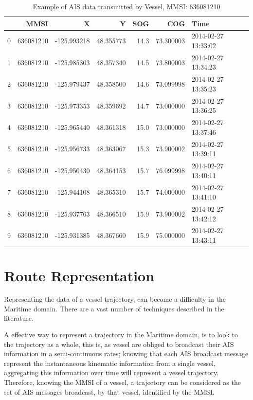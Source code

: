 \begin{table}[H]
  \centering
{\small
\begin{tabular}{lrrrrrl}
\toprule
{} &       MMSI &           X &          Y &   SOG &        COG &                Time \\
\midrule
0 &  636081210 & -125.993218 &  48.355773 &  14.3 &  73.300003 & 2014-02-27 13:33:02 \\
1 &  636081210 & -125.985303 &  48.357340 &  14.5 &  73.800003 & 2014-02-27 13:34:23 \\
2 &  636081210 & -125.979437 &  48.358500 &  14.6 &  73.099998 & 2014-02-27 13:35:23 \\
3 &  636081210 & -125.973353 &  48.359692 &  14.7 &  73.000000 & 2014-02-27 13:36:25 \\
4 &  636081210 & -125.965440 &  48.361318 &  15.0 &  73.000000 & 2014-02-27 13:37:46 \\
5 &  636081210 & -125.956733 &  48.363067 &  15.3 &  73.900002 & 2014-02-27 13:39:11 \\
6 &  636081210 & -125.950430 &  48.364153 &  15.7 &  76.099998 & 2014-02-27 13:40:11 \\
7 &  636081210 & -125.944108 &  48.365310 &  15.7 &  74.000000 & 2014-02-27 13:41:10 \\
8 &  636081210 & -125.937763 &  48.366510 &  15.9 &  73.900002 & 2014-02-27 13:42:12 \\
9 &  636081210 & -125.931385 &  48.367660 &  15.9 &  75.000000 & 2014-02-27 13:43:11 \\
\bottomrule
\end{tabular} }
\caption{Example of AIS data transmitted by Vessel, MMSI: 636081210}
\label{Table: TableAIS1}
\end{table}


\section{Route Representation}
Representing the data of a vessel trajectory, can become a difficulty in the Maritime domain. There are a vast number of techniques described in the literature.

A effective way to represent a trajectory in the Maritime domain, is to look to the trajectory as a whole, this is, as vessel are obliged to broadcast their AIS information in a semi-continuous rates; knowing that each AIS broadcast message represent the instantaneous kinematic information from a single vessel, aggregating this information over time will represent a vessel trajectory. Therefore, knowing the MMSI of a vessel, a trajectory can be considered as the set of AIS messages broadcast, by that vessel, identified by the MMSI.


